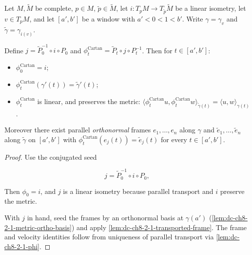 \begin{lemma}
  \label{lem:dc-ch8-2-1-cartan-frame-data}
  \leanok
  Let $M,\tilde M$ be complete, $p\in M$, $\tilde p\in\tilde M$, let $i:T_pM\to T_{\tilde p}\tilde
  M$ be a linear isometry, let $v\in T_pM$, and let $[a',b']$ be a window with $a'<0<1<b'$. Write
  $\gamma=\gamma_v$ and $\tilde\gamma=\gamma_{i(v)}$.

  Define $j=\tilde P_0^{-1}\circ i\circ P_0$ and
  $\phi^{\mathrm{Cartan}}_t=\tilde P_t\circ j\circ P_t^{-1}$. Then for
  $t\in[a',b']$:
  \begin{itemize}
    \item $\phi^{\mathrm{Cartan}}_0=i$;
    \item $\phi^{\mathrm{Cartan}}_t(\gamma'(t))=\tilde\gamma'(t)$;
    \item $\phi^{\mathrm{Cartan}}_t$ is linear, and preserves the metric:
      $\langle\phi^{\mathrm{Cartan}}_tu,\phi^{\mathrm{Cartan}}_tw\rangle_{\tilde\gamma(t)}
      =\langle u,w\rangle_{\gamma(t)}$.
  \end{itemize}
  Moreover there exist parallel \emph{orthonormal} frames $e_1,\dots,e_n$ along $\gamma$ and
  $\tilde e_1,\dots,\tilde e_n$ along $\tilde\gamma$ on $[a',b']$ with
  $\phi^{\mathrm{Cartan}}_t(e_j(t))=\tilde e_j(t)$ for every $t\in[a',b']$.
\end{lemma}
\begin{proof}
  \leanok
\sketch
  Use the conjugated seed

  $$
  j=\tilde P_0^{-1}\circ i\circ P_0 ,
  $$

  Then $\phi_0=i$, and $j$ is a linear isometry because parallel transport and $i$
  preserve the metric.

  With $j$ in hand, seed the frames by an orthonormal basis at $\gamma(a')$
  (\cref{lem:dc-ch8-2-1-metric-ortho-basis}) and apply
  \cref{lem:dc-ch8-2-1-transported-frame}. The frame and velocity identities follow from
  uniqueness of parallel transport via \cref{lem:dc-ch8-2-1-phi}.
\end{proof}

